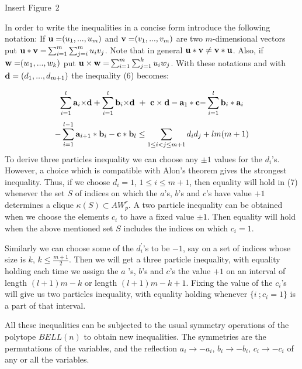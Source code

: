\begin{center}
{\large Insert Figure\ 2}
\end{center}

In order to write the inequalities in a concise form introduce the following
notation: If ${\bf u=}(u_{1},...,u_{m})$ and ${\bf v=}(v_{1},...,v_{m})$ are
two $m$-dimensional vectors put ${\bf u\ast v=}\sum_{i=1}^{m}%
\sum_{j=i}^{m}u_{i}v_{j}$. Note that in general ${\bf u\ast v\neq v\ast u}$.
Also, if ${\bf w=}(w_{1},...,w_{k})$ put ${\bf u\times w=}%
\sum_{i=1}^{m}\sum_{j=1}^{k}u_{i}w_{j}$. With these notations and with ${\bf %
d}=(d_{1},...,d_{m+1})$ the inequality (6) becomes:

\begin{gather}
\sum_{i=1}^{l}{\bf a}_{i}{\bf \times d}+\sum_{i=1}^{l}{\bf b}_{i}{\bf \times
d\ +\ c}\times {\bf d}-{\bf a}_{1}\ast {\bf c-}\sum_{i=1}^{l}{\bf b}_{i}\ast
{\bf a}_{i}\smallskip  \nonumber \\
-\sum_{i=1}^{l-1}{\bf a}_{i+1}\ast {\bf b}_{i}-{\bf c\ast b}_{l}\leq
\sum_{1\leq i<j\leq m+1}d_{i}d_{j}+lm(m+1)
\end{gather}
To derive three particles inequality we can choose any $\pm 1$ values for
the $d_{i}$'s. However, a choice which is compatible with Alon's theorem
gives the strongest inequality. Thus, if we choose $d_{i}=1$, $1\leq i\leq
m+1$, then equality will hold in (7) whenever the set $S$ of indices on
which the $a$'s, $b$'s and $c$'s have value $+1$ determines a clique $\kappa
(S)\subset AW_{p}^{r}$. A two particle inequality can be obtained when we
choose the elements $c_{i}$ to have a fixed value $\pm 1$. Then equality
will hold when the above mentioned set $S$ includes the indices on which $%
c_{i}=1$.

Similarly we can choose some of the $d_{i}^{\prime }$'s to be $-1$, say on a
set of indices whose size is $k$, $k\leq \frac{m+1}{2}$. Then we will get a
three particle inequality, with equality holding each time we assign the $a$%
's, $b$'s and $c$'s the value $+1$ on an interval of length $(l+1)m-k$ or
length $(l+1)m-k+1$. Fixing the value of the $c_{i}$'s will give us two
particles inequality, with equality holding whenever $\{i\ ;c_{i}=1\}$ is a
part of that interval.

All these inequalities can be subjected to the usual symmetry operations of
the polytope $BELL(n)$ to obtain new inequalities. The symmetries are the
permutations of the variables, and the reflection $a_{i}\rightarrow -a_{i}$,
$b_{i}\rightarrow -b_{i}$, $c_{i}\rightarrow -c_{i}$ of any or all the
variables.

